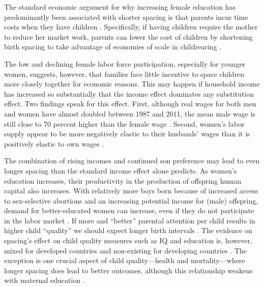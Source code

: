\documentclass[12pt,letterpaper]{article}
\begin{document}
The standard economic argument for why increasing female education has predominantly
been associated with shorter spacing is that parents incur time costs when they have 
children \citep{Hotz1997,schultz97}.
Specifically, if having children require the mother to reduce her market work, parents 
can lower the cost of children by shortening birth spacing to 
take advantage of economies of scale in childrearing \citep{Vijverberg1982}.

The low and declining female labor force participation, especially for younger women, 
suggests, however, that families face little incentive to space children more closely 
together for economic reasons.
This may happen if household income has increased so substantially that the income effect 
dominates any substitution effect.
Two findings speak for this effect.
First, although real wages for both men and women have almost doubled between 1987 and 
2011, the mean male wage is still close to 70 percent higher than the female wage 
\citep{Klasen2015,Bhargava2018}.
Second, women’s labor supply appear to be more negatively elastic to their husbands' 
wages than it is positively elastic to own wages \citep{Bhargava2018}.

The combination of rising incomes and continued son preference may lead to even longer 
spacing than the standard income effect alone predicts.
As women's education increases, their productivity in the production of offspring human 
capital also increases.
With relatively more boys born because of increased access to sex-selective 
abortions and an increasing potential income for (male) offspring, demand for 
better-educated women can increase, even if they do not participate in the labor market 
\citep{Behrman1999}.
If more and ``better'' parental attention per child results in higher child ``quality'' 
we should expect longer birth intervals 
\citep{Zajonc1975,Zajonc1976,Razin1980}.
The evidence on spacing's effect on child quality measures such as IQ 
and education is, however, mixed for developed countries and non-existing 
for developing countries
\citep{Powell1993,Pettersson-Lidbom2009,Buckles2012,Barclay2017}.
The exception is one crucial aspect of child quality---health and mortality---where
longer spacing does lead to better outcomes, although this relationship weakens with 
maternal education \citep{Whitworth2002,Conde-Agudelo2012,Molitoris2019}.

\end{document}
